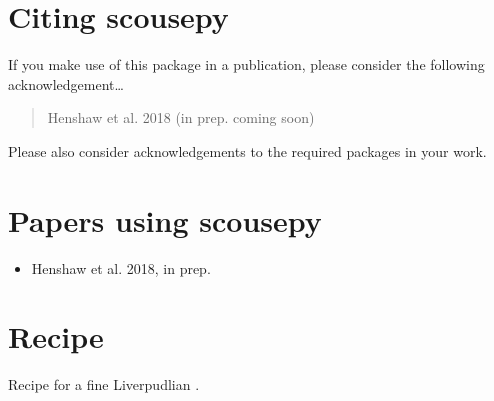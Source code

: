 \documentclass[letterpaper,10pt,english]{sphinxmanual}
\begin{document}
\chapter{Citing scousepy}
\label{\detokenize{index:citing-scousepy}}
If you make use of this package in a publication, please consider the following
acknowledgement…
\begin{quote}

Henshaw et al. 2018 (in prep. coming soon)
\end{quote}

Please also consider acknowledgements to the required packages in your work.


\chapter{Papers using scousepy}
\label{\detokenize{index:papers-using-scousepy}}\begin{itemize}
\item {} 
Henshaw et al. 2018, in prep.

\end{itemize}


\chapter{Recipe}
\label{\detokenize{index:recipe}}
Recipe for a fine Liverpudlian .



\renewcommand{\indexname}{Index}
\printindex
\end{document}
